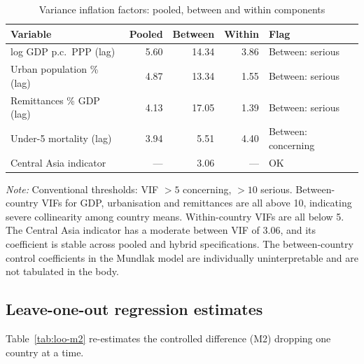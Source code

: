 \begin{table}[htbp]
\centering
\caption{Variance inflation factors: pooled, between and within components}
\label{tab:vif}
\small
\begin{tabular}{lrrrl}
\toprule
Variable & Pooled & Between & Within & Flag \\
\midrule
log GDP p.c.\ PPP (lag) & 5.60 & 14.34 & 3.86 & Between: serious \\
Urban population \% (lag) & 4.87 & 13.34 & 1.55 & Between: serious \\
Remittances \% GDP (lag) & 4.13 & 17.05 & 1.39 & Between: serious \\
Under-5 mortality (lag) & 3.94 & 5.51 & 4.40 & Between: concerning \\
Central Asia indicator & --- & 3.06 & --- & OK \\
\bottomrule
\end{tabular}

\begin{minipage}{\textwidth}\footnotesize
\vspace{4pt}
\emph{Note:} Conventional thresholds: VIF $> 5$ concerning, $> 10$ serious. Between-country VIFs for GDP, urbanisation and remittances are all above 10, indicating severe collinearity among country means. Within-country VIFs are all below 5. The Central Asia indicator has a moderate between VIF of 3.06, and its coefficient is stable across pooled and hybrid specifications. The between-country control coefficients in the Mundlak model are individually uninterpretable and are not tabulated in the body.
\end{minipage}
\end{table}

\subsection{Leave-one-out regression estimates}
\label{app:loo-regression}

Table~\ref{tab:loo-m2} re-estimates the controlled difference (M2) dropping one country at a time.

